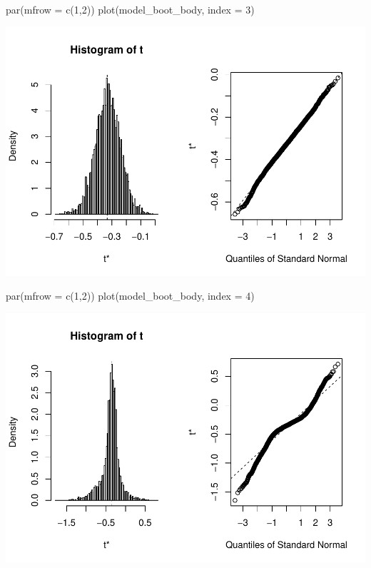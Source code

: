 \documentclass[
]{article}
\newenvironment{Shaded}{\begin{snugshade}}{\end{snugshade}}
\newcommand{\AttributeTok}[1]{\textcolor[rgb]{0.77,0.63,0.00}{#1}}
\newcommand{\DecValTok}[1]{\textcolor[rgb]{0.00,0.00,0.81}{#1}}
\newcommand{\FunctionTok}[1]{\textcolor[rgb]{0.00,0.00,0.00}{#1}}
\newcommand{\NormalTok}[1]{#1}
\begin{document}
\begin{Shaded}
\begin{Highlighting}[]
\FunctionTok{par}\NormalTok{(}\AttributeTok{mfrow =} \FunctionTok{c}\NormalTok{(}\DecValTok{1}\NormalTok{,}\DecValTok{2}\NormalTok{))}
\FunctionTok{plot}\NormalTok{(model\_boot\_body, }\AttributeTok{index =} \DecValTok{3}\NormalTok{)}
\end{Highlighting}
\end{Shaded}

\includegraphics{STAT641_Final_Report_files/figure-latex/unnamed-chunk-16-1.pdf}

\begin{Shaded}
\begin{Highlighting}[]
\FunctionTok{par}\NormalTok{(}\AttributeTok{mfrow =} \FunctionTok{c}\NormalTok{(}\DecValTok{1}\NormalTok{,}\DecValTok{2}\NormalTok{))}
\FunctionTok{plot}\NormalTok{(model\_boot\_body, }\AttributeTok{index =} \DecValTok{4}\NormalTok{)}
\end{Highlighting}
\end{Shaded}

\includegraphics{STAT641_Final_Report_files/figure-latex/unnamed-chunk-17-1.pdf}
\end{document}

